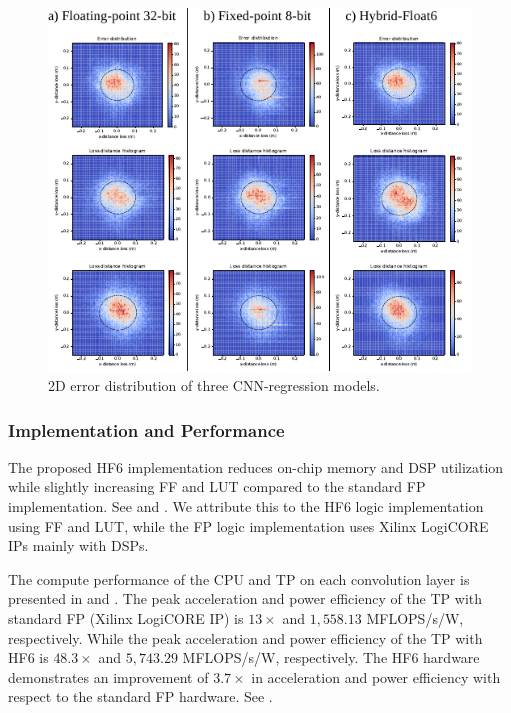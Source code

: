 \begin{figure}[t!]
	\centering
	\includegraphics[width=1\columnwidth]{../figures/histograms/2D_error_distribtion.pdf}
	\caption{2D error distribution of three CNN-regression models.}
	\label{fig:2d_error_distribtion}
\end{figure}

\subsubsection{Implementation and Performance}
The proposed HF6 implementation reduces on-chip memory and DSP utilization while slightly increasing FF and LUT compared to the standard FP implementation. See  and . We attribute this to the HF6 logic implementation using FF and LUT, while the FP logic implementation uses Xilinx LogiCORE IPs mainly with DSPs.

The compute performance of the CPU and TP on each convolution layer is presented in  and . 
The peak acceleration and power efficiency of the TP with standard FP (Xilinx LogiCORE IP) is $13\times$ and $1,558.13$ MFLOPS/s/W, respectively. While the peak acceleration and power efficiency of the TP with HF6 is $48.3\times$ and $5,743.29$ MFLOPS/s/W, respectively. The HF6 hardware demonstrates an improvement of $3.7\times$ in acceleration and power efficiency with respect to the standard FP hardware. See .

